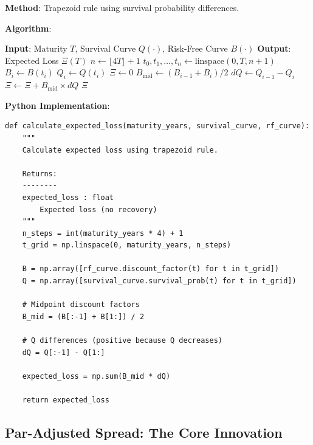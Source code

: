 \documentclass[11pt,a4paper]{article}
\begin{document}
\begin{implbox}
\textbf{Method}: Trapezoid rule using survival probability differences.

\textbf{Algorithm}:

\begin{algorithm}[H]
\caption{Calculate Expected Loss}
\begin{algorithmic}[1]
\STATE \textbf{Input}: Maturity $T$, Survival Curve $Q(\cdot)$, Risk-Free Curve $B(\cdot)$
\STATE \textbf{Output}: Expected Loss $\Xi(T)$
\STATE
\STATE $n \gets \lfloor 4T \rfloor + 1$
\STATE $t_0, t_1, \ldots, t_n \gets \text{linspace}(0, T, n+1)$
\STATE
{}
    \STATE $B_i \gets B(t_i)$
    \STATE $Q_i \gets Q(t_i)$
\ENDFOR
\STATE
\STATE $\Xi \gets 0$
    \STATE $B_{\text{mid}} \gets (B_{i-1} + B_i) / 2$ 
    \STATE $dQ \gets Q_{i-1} - Q_i$ 
    \STATE $\Xi \gets \Xi + B_{\text{mid}} \times dQ$
\ENDFOR
\STATE
\RETURN $\Xi$
\end{algorithmic}
\end{algorithm}

\textbf{Python Implementation}:
\begin{lstlisting}
def calculate_expected_loss(maturity_years, survival_curve, rf_curve):
    """
    Calculate expected loss using trapezoid rule.
    
    Returns:
    --------
    expected_loss : float
        Expected loss (no recovery)
    """
    n_steps = int(maturity_years * 4) + 1
    t_grid = np.linspace(0, maturity_years, n_steps)
    
    B = np.array([rf_curve.discount_factor(t) for t in t_grid])
    Q = np.array([survival_curve.survival_prob(t) for t in t_grid])
    
    # Midpoint discount factors
    B_mid = (B[:-1] + B[1:]) / 2
    
    # Q differences (positive because Q decreases)
    dQ = Q[:-1] - Q[1:]
    
    expected_loss = np.sum(B_mid * dQ)
    
    return expected_loss
\end{lstlisting}
\end{implbox}

\subsection{Par-Adjusted Spread: The Core Innovation}
\label{sec:par_adjusted_spread}
\end{document}

